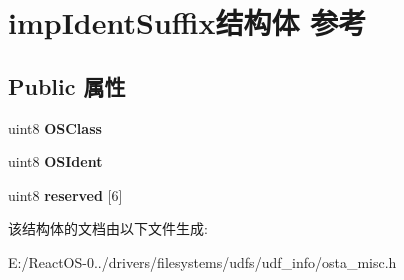 \hypertarget{structimp_ident_suffix}{}\section{imp\+Ident\+Suffix结构体 参考}
\label{structimp_ident_suffix}
\subsection*{Public 属性}
\begin{DoxyCompactItemize}
\item 
\mbox{\label{structimp_ident_suffix_a154c43bd9df6f0df437d7cd18ff2dfe5}} 
uint8 {\bfseries O\+S\+Class}
\item 
\mbox{\label{structimp_ident_suffix_a505d6e1d0d495b20fc7c7e3b25218238}} 
uint8 {\bfseries O\+S\+Ident}
\item 
\mbox{\label{structimp_ident_suffix_a66df59f8122b115c083786d5c755a36b}} 
uint8 {\bfseries reserved} \mbox{[}6\mbox{]}
\end{DoxyCompactItemize}


该结构体的文档由以下文件生成\+:\begin{DoxyCompactItemize}
\item 
E\+:/\+React\+O\+S-\/0../drivers/filesystems/udfs/udf\+\_\+info/osta\+\_\+misc.\+h\end{DoxyCompactItemize}
